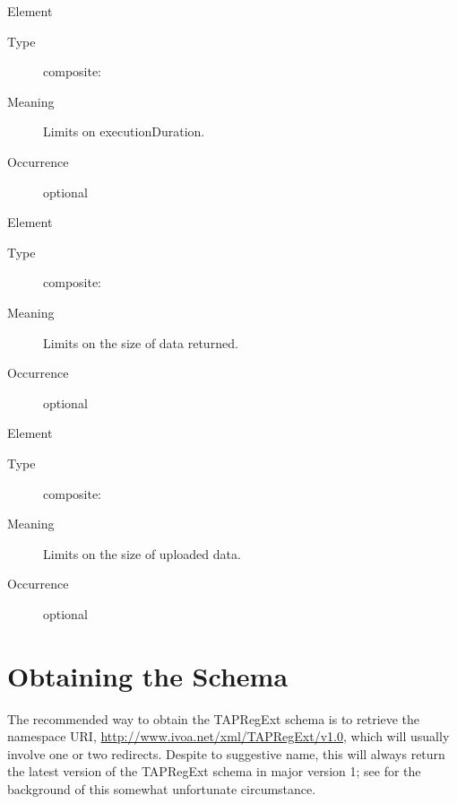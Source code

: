 \documentclass{ivoa}
\begin{document}
\begin{generated}
\begin{bigdescription}
\begin{description}
\end{description}
\item[Element \xmlel{executionDuration}]
\begin{description}
\item[Type] composite: 
\item[Meaning] 
              Limits on executionDuration.
              
\item[Occurrence] optional

\end{description}
\item[Element \xmlel{outputLimit}]
\begin{description}
\item[Type] composite: 
\item[Meaning] 
              Limits on the size of data returned.
              
\item[Occurrence] optional

\end{description}
\item[Element \xmlel{uploadLimit}]
\begin{description}
\item[Type] composite: 
\item[Meaning] 
              Limits on the size of uploaded data.
              
\item[Occurrence] optional

\end{description}


\end{bigdescription}\endgroup

\endgroup
\end{generated}


\appendix


\section{Obtaining the Schema}

\label{app:fullschema}

The recommended way to obtain the TAPRegExt schema is to retrieve the
namespace URI, \url{http://www.ivoa.net/xml/TAPRegExt/v1.0}, which will
usually involve one or two redirects.  Despite to suggestive name, this
will always return the latest version of the TAPRegExt schema in major
version 1; see \citet{2018ivoa.spec.0529H} for the background of this
somewhat unfortunate circumstance.
\end{document}
